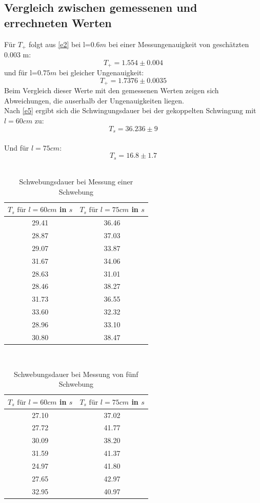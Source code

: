 \subsection{Vergleich zwischen gemessenen und errechneten Werten}
Für $T_+$ folgt aus \eqref{e2} bei l=$0.6 m$ bei einer Messungenauigkeit von geschätzten 0.003 m:
\begin{equation*}
  T_+ = 1.554 \pm 0.004
\end{equation*}
und für l=$0.75 m$ bei gleicher Ungenauigkeit:
\begin{equation*}
  T_+ = 1.7376 \pm 0.0035
\end{equation*}
Beim Vergleich dieser Werte mit den gemessenen Werten zeigen sich Abweichungen, die auserhalb der Ungenauigkeiten liegen.
\\
Nach \eqref{e5} ergibt sich die Schwingungsdauer bei der gekoppelten Schwingung mit $l = 60cm$ zu:
\begin{equation*}
  T_s = 36.236 \pm 9
\end{equation*}
\\
Und für $l = 75cm$:
\begin{equation*}
  T_s = 16.8 \pm 1.7
\end{equation*}
\\
\begin{table}[b]
  \centering
  \caption{Schwebungsdauer bei Messung einer Schwebung}
  \label{tab:data3}
  \begin{tabular}{c c}
    \toprule
    $T_{s} \text{ für } l=60cm$ in $s$ & $T_{s} \text{ für } l=75cm$ in $s$ \\
    \midrule
    29.41 & 36.46 \\
    28.87 & 37.03 \\
    29.07 & 33.87 \\
    31.67 & 34.06 \\
    28.63 & 31.01 \\
    28.46 & 38.27 \\
    31.73 & 36.55 \\
    33.60 & 32.32 \\
    28.96 & 33.10 \\
    30.80 & 38.47 \\
    \bottomrule
  \end{tabular}
\end{table}
\\
\begin{table}[b]
  \centering
  \caption{Schwebungsdauer bei Messung von fünf Schwebung}
  \label{tab:data4}
  \begin{tabular}{c c}
    \toprule
    $T_{s} \text{ für }l=60cm$ in $s$ & $T_{s} \text{ für } l=75cm$ in $s$ \\
    \midrule
    27.10 & 37.02 \\
    27.72 & 41.77 \\
    30.09 & 38.20 \\
    31.59 & 41.37 \\
    24.97 & 41.80 \\
    27.65 & 42.97 \\
    32.95 & 40.97 \\
    \bottomrule
  \end{tabular}
\end{table}
